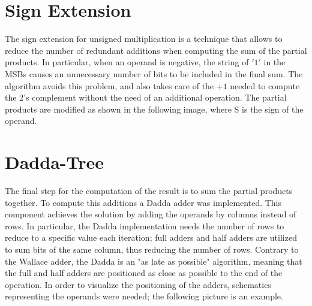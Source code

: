 \section{Sign Extension}
The sign extension for unsigned multiplication is a technique that allows to reduce the number of redundant additions when computing the sum of the partial products.
In particular, when an operand is negative, the string of $'1'$ in the MSBs causes an unnecessary number of bits to be included in the final sum. The algorithm avoids this problem,
and also takes care of the $+1$ needed to compute the 2's complement without the need of an additional operation. The partial products are modified as shown in the following image,
where S is the sign of the operand. 

\section{Dadda-Tree}
The final step for the computation of the result is to sum the partial products together. To compute this additions a Dadda adder was implemented. This component
achieves the solution by adding the operands by columns instead of rows. In particular, the Dadda implementation needs the number of rows to reduce to a specific value
each iteration; full adders and half adders are utilized to sum bits of the same column, thus reducing the number of rows. Contrary to the Wallace adder, the Dadda is
an "as late as possible" algorithm, meaning that the full and half adders are positioned as close as possible to the end of the operation. 
In order to visualize the positioning of the adders, schematics representing the operands were needed; the following picture is an example.



